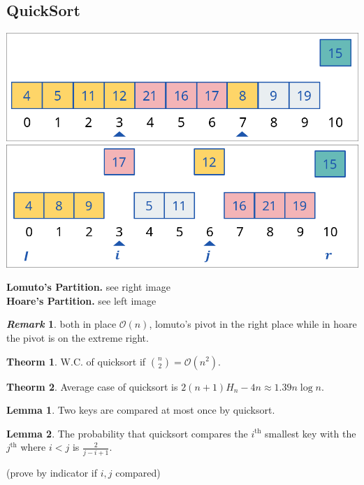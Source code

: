 \documentclass[]{article}
\newcommand\compactsubsection[1]        {\vspace{-10pt}\subsection{#1}\vspace{-6pt}}
\theoremstyle{definition}
\newtheorem{Theorem}{\color{theoColor}Theorm}
\newtheorem{Lemma}{\color{lemColor}Lemma}
\newtheorem{Remark}{\textit{Remark}}
\newcommand\theo  [1] {\begin{Theorem}#1\end{Theorem}}
\newcommand\lem   [1] {\begin{Lemma}#1\end{Lemma}}
\newcommand\oc    {\mathcal{O}}
\newcommand\logn      {\log n}
\begin{document}
\begin{multicols}{4}
			\compactsubsection{QuickSort}
				\begin{center}
					\includegraphics[width=0.51\linewidth]{images/lomuto}
					\includegraphics[width=0.45\linewidth]{images/horse}
				\end{center}

				\textbf{Lomuto's Partition. } see right image \\
				\textbf{Hoare's Partition. } see left image
				
				\begin{Remark}
					both in place $\oc(n)$, lomuto's pivot in the right place while in hoare the pivot is on the extreme right. 
				\end{Remark}
				
				\theo{W.C. of quicksort if $\binom{n}{2} = \oc(n^2)$. }
				\theo{Average case of quicksort is $2(n + 1)H_n - 4n \approx 1.39n\logn$. }
				\lem{Two keys are compared at most once by quicksort. }
				\lem{The probability that quicksort compares the $i^{\text{th}}$ smallest key with the $j^{\text{th}}$ where $i< j$ is $\frac{2}{j - i + 1}$. }
				(prove by indicator if $i, j$ compared)
		

\end{multicols}
\end{document}

